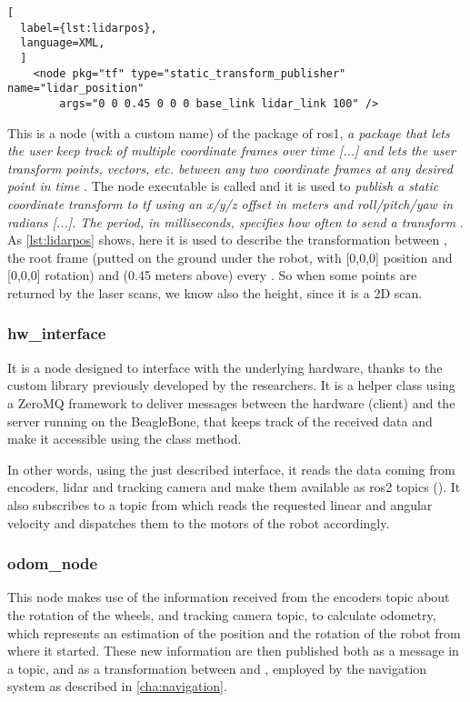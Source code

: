 \begin{lstlisting}[
  label={lst:lidarpos},
  language=XML,
  ]
    <node pkg="tf" type="static_transform_publisher" name="lidar_position"
        args="0 0 0.45 0 0 0 base_link lidar_link 100" />
\end{lstlisting}

This is a node (with a custom name) of the  package of \acrshort{ros}1, \textit{a package that lets the user keep track of multiple coordinate frames over time [...] and lets the user transform points, vectors, etc. between any two coordinate frames at any desired point in time} \cite{tf}. The node executable is called  and it is used to \textit{publish a static coordinate transform to tf using an x/y/z offset in meters and roll/pitch/yaw in radians [...]. The period, in milliseconds, specifies how often to send a transform} \cite{tf}. 
As \autoref{lst:lidarpos} shows, here it is used to describe the transformation between , the root frame (putted on the ground under the robot, with [0,0,0] position and [0,0,0] rotation) and  (0.45 meters above) every . So when some points are returned by the laser scans, we know also the height, since it is a 2D scan.  

\subsubsection{hw\_interface}

It is a node designed to interface with the underlying hardware, thanks to the custom  library previously developed by the researchers. It is a helper class using a ZeroMQ framework to deliver messages between the hardware (client) and the server running on the BeagleBone, that keeps track of the received data and make it accessible using the class method.

In other words, using the just described interface, it reads the data coming from encoders, lidar and tracking camera and make them available as \acrshort{ros}2 topics (). It also subscribes to a  topic from which reads the requested linear and angular velocity and dispatches them to the motors of the robot accordingly.

\subsubsection{odom\_node}

This node makes use of the information received from the encoders topic about the rotation of the wheels, and tracking camera topic, to calculate odometry, which represents an estimation of the position and the rotation of the robot from where it started. These new information are then published both as a message in a topic, and as a transformation between  and , employed by the navigation system as described in \autoref{cha:navigation}.